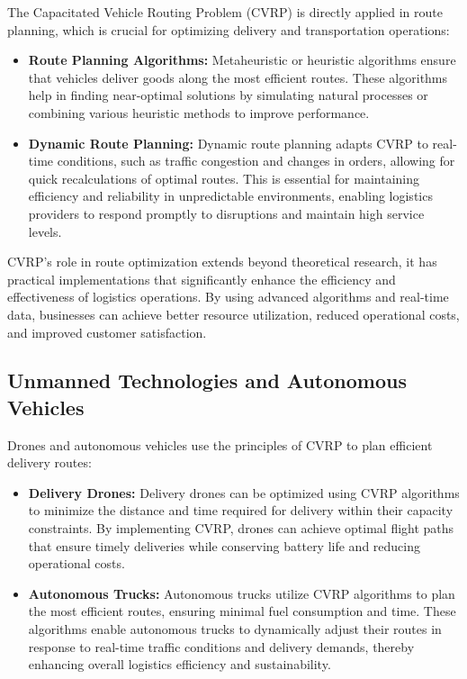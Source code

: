 \documentclass{article}
\begin{document}
    The Capacitated Vehicle Routing Problem (CVRP) is directly applied in route planning, which is crucial for optimizing delivery and transportation operations:

    \begin{itemize}
        \item \textbf{Route Planning Algorithms:} Metaheuristic or heuristic algorithms ensure that vehicles deliver goods along the most efficient routes. These algorithms help in finding near-optimal solutions by simulating natural processes or combining various heuristic methods to improve performance.
        \item \textbf{Dynamic Route Planning:} Dynamic route planning adapts CVRP to real-time conditions, such as traffic congestion and changes in orders, allowing for quick recalculations of optimal routes. This is essential for maintaining efficiency and reliability in unpredictable environments, enabling logistics providers to respond promptly to disruptions and maintain high service levels.
    \end{itemize}

    CVRP's role in route optimization extends beyond theoretical research, it has practical implementations that significantly enhance the efficiency and effectiveness of logistics operations. By using advanced algorithms and real-time data, businesses can achieve better resource utilization, reduced operational costs, and improved customer satisfaction.

    \subsection{Unmanned Technologies and Autonomous Vehicles}\label{sec:unmanned-technologies-and-autonomous-vehicles}

    Drones and autonomous vehicles use the principles of CVRP to plan efficient delivery routes:

    \begin{itemize}
        \item \textbf{Delivery Drones:} Delivery drones can be optimized using CVRP algorithms to minimize the distance and time required for delivery within their capacity constraints. By implementing CVRP, drones can achieve optimal flight paths that ensure timely deliveries while conserving battery life and reducing operational costs.
        \item \textbf{Autonomous Trucks:} Autonomous trucks utilize CVRP algorithms to plan the most efficient routes, ensuring minimal fuel consumption and time. These algorithms enable autonomous trucks to dynamically adjust their routes in response to real-time traffic conditions and delivery demands, thereby enhancing overall logistics efficiency and sustainability.
    \end{itemize}
\end{document}

